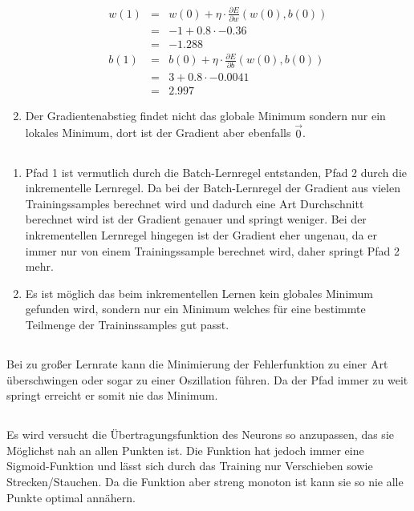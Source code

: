 \documentclass[DIN, pagenumber=false, fontsize=11pt, parskip=half]{scrartcl}
\begin{document}
\begin{enumerate}[label=(\alph*)]
            \begin{eqnarray*}
                w(1) &=& w(0) + \eta \cdot \frac{\partial E}{\partial w}(w(0),b(0)) \\
                &=& -1 + 0.8 \cdot -0.36 \\
                &=& -1.288 \\
                b(1) &=& b(0) + \eta \cdot \frac{\partial E}{\partial b}(w(0), b(0)) \\
                &=& 3 + 0.8 \cdot -0.0041 \\
                &=& 2.997
            \end{eqnarray*}
        \item Der Gradientenabstieg findet nicht das globale Minimum sondern nur ein lokales Minimum, dort ist der Gradient aber ebenfalls $\vec{0}$.
    \end{enumerate}
    \subsection{}
    \begin{enumerate}[label=(\alph*)]
        \item Pfad 1 ist vermutlich durch die Batch-Lernregel entstanden, Pfad 2 durch die inkrementelle Lernregel. 
            Da bei der Batch-Lernregel der Gradient aus vielen Trainingssamples berechnet wird und dadurch eine Art Durchschnitt berechnet wird ist der Gradient genauer und springt weniger. 
            Bei der inkrementellen Lernregel hingegen ist der Gradient eher ungenau, da er immer nur von einem Trainingssample berechnet wird, daher springt Pfad 2 mehr.
        \item Es ist möglich das beim inkrementellen Lernen kein globales Minimum gefunden wird, sondern nur ein Minimum welches für eine bestimmte Teilmenge der Traininssamples gut passt.
    \end{enumerate}
    \subsection{}
    Bei zu großer Lernrate kann die Minimierung der Fehlerfunktion zu einer Art überschwingen oder sogar zu einer Oszillation führen. Da der Pfad immer zu weit \glqq{}springt\grqq{} erreicht er somit nie das Minimum.
    \subsection{}
    Es wird versucht die Übertragungsfunktion des Neurons so anzupassen, das sie Möglichst nah an allen Punkten ist. Die Funktion hat jedoch immer eine Sigmoid-Funktion und lässt sich durch das Training nur Verschieben sowie Strecken/Stauchen. Da die Funktion aber streng monoton ist kann sie so nie alle Punkte optimal annähern.
\end{document}
